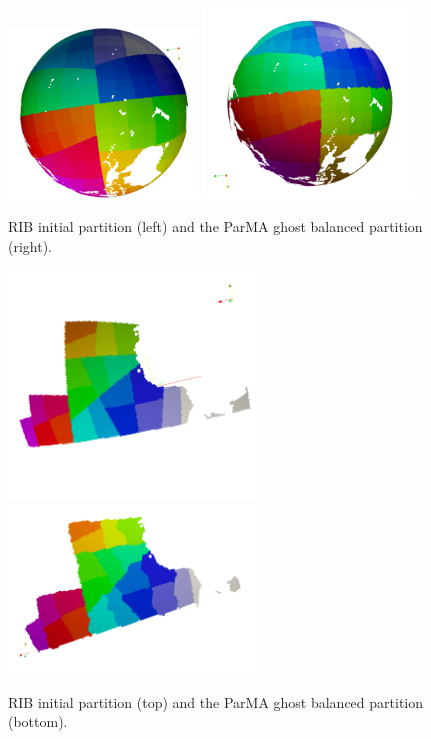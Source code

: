 \documentclass[a4paper]{article}
\begin{document}
\begin{figure} 
\centering
\includegraphics[width=0.45\textwidth]{60km/init/0_255.png}
\includegraphics[width=0.5\textwidth]{60km/final/0_255.png}
\caption{\label{fig:60km0_255} RIB initial partition (left) and the ParMA ghost balanced partition (right).}

\includegraphics[width=0.6\textwidth]{60km/init/384_404.png}
\includegraphics[width=0.6\textwidth]{60km/final/384_404.png}
\caption{\label{fig:60km384_404} RIB initial partition (top) and the ParMA ghost balanced partition (bottom).}
\end{figure}
\end{document}
